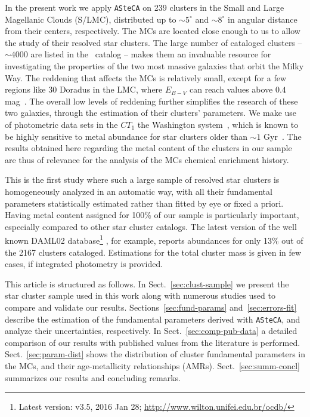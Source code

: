 \documentclass{aa}
\begin{document}
In the present work we apply \texttt{ASteCA} on 239 clusters in the Small and
Large Magellanic Clouds (S/LMC), distributed up to ${\sim}5^{\circ}$ and $
{\sim}8^{\circ}$ in angular distance from their centers, respectively.
%
The MCs are located close enough to us to allow the study of their resolved star
clusters. The large number of cataloged clusters -- $\sim4000$ are listed in
the~\cite{Bica_2008} catalog -- makes them an invaluable resource for
investigating the properties of the two most massive galaxies that orbit the
Milky Way.
%
The reddening that affects the MCs is relatively small, except for a few regions
like 30 Doradus in the LMC, where $E_{B-V}$ can reach values above $0.4$
mag~\citep{Piatti_2015b}. The overall low levels of reddening further simplifies
the research of these two galaxies, through the estimation of their clusters'
parameters.
%
We make use of photometric data sets in the $CT_1$ the Washington
system~\citep{Canterna_1976,Geisler_1996}, which is known to be highly sensitive
to metal abundance for star clusters older than ${\sim}1$
Gyr~\citep{Geisler_1999}.
The results obtained here regarding the metal content of the clusters in our
sample are thus of relevance for the analysis of the MCs chemical
enrichment history.

This is the first study where such a large sample of resolved star clusters is
homogeneously analyzed in an automatic way, with all their fundamental
parameters statistically estimated rather than fitted by eye or fixed a priori.
%
Having metal content assigned for 100\% of our sample is particularly
important, especially compared to other star cluster catalogs. The latest
version of the well known DAML02 database\footnote{Latest version: v3.5, 2016
Jan 28; \url{http://www.wilton.unifei.edu.br/ocdb/}}
\citep{Dias_2002}, for example, reports abundances for only 13\% out of the 2167
clusters cataloged. Estimations for the total cluster mass is given in few
cases, if integrated photometry is provided.

This article is structured as follows.
In Sect.~\ref{sec:clust-sample} we present the star cluster sample used in
this work along with numerous studies used to compare and validate our
results.
Sections~\ref{sec:fund-params} and~\ref{sec:errors-fit} describe the estimation
of the fundamental parameters derived with \texttt{ASteCA}, and analyze their
uncertainties, respectively.
In Sect.~\ref{sec:comp-pub-data} a detailed comparison of our results with
published values from the literature is performed.
Sect.~\ref{sec:param-dist} shows the distribution of cluster fundamental
parameters in the MCs, and their age-metallicity relationships (AMRs).
Sect.~\ref{sec:summ-concl} summarizes our results and concluding
remarks.
\end{document}
